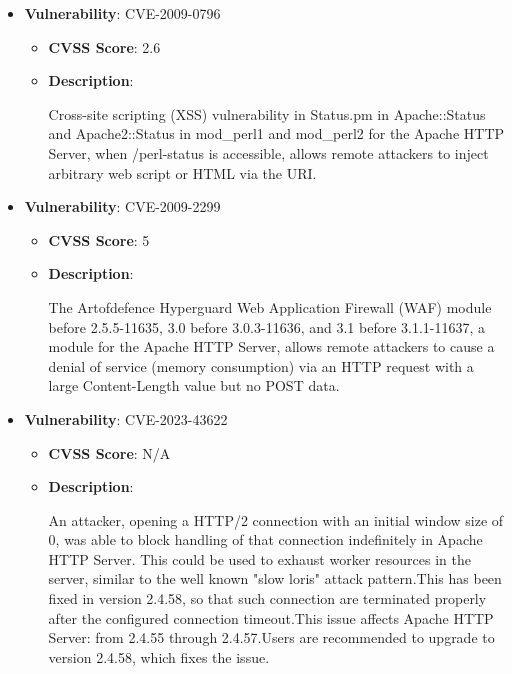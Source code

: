 \documentclass{article}
\begin{document}
\begin{itemize}
        \item \textbf{Vulnerability}: CVE-2009-0796
        \begin{itemize}
            \item \textbf{CVSS Score}:  2.6 
            \item \textbf{Description}:
            \parbox[t]{0.9\linewidth}{
                \ttfamily Cross-site scripting (XSS) vulnerability in Status.pm in Apache::Status and Apache2::Status in mod\_perl1 and mod\_perl2 for the Apache HTTP Server, when /perl-status is accessible, allows remote attackers to inject arbitrary web script or HTML via the URI.
            }
        \end{itemize}
    
        \item \textbf{Vulnerability}: CVE-2009-2299
        \begin{itemize}
            \item \textbf{CVSS Score}:  5 
            \item \textbf{Description}:
            \parbox[t]{0.9\linewidth}{
                \ttfamily The Artofdefence Hyperguard Web Application Firewall (WAF) module before 2.5.5-11635, 3.0 before 3.0.3-11636, and 3.1 before 3.1.1-11637, a module for the Apache HTTP Server, allows remote attackers to cause a denial of service (memory consumption) via an HTTP request with a large Content-Length value but no POST data.
            }
        \end{itemize}
    
        \item \textbf{Vulnerability}: CVE-2023-43622
        \begin{itemize}
            \item \textbf{CVSS Score}:  N/A 
            \item \textbf{Description}:
            \parbox[t]{0.9\linewidth}{
                \ttfamily An attacker, opening a HTTP/2 connection with an initial window size of 0, was able to block handling of that connection indefinitely in Apache HTTP Server. This could be used to exhaust worker resources in the server, similar to the well known "slow loris" attack pattern.This has been fixed in version 2.4.58, so that such connection are terminated properly after the configured connection timeout.This issue affects Apache HTTP Server: from 2.4.55 through 2.4.57.Users are recommended to upgrade to version 2.4.58, which fixes the issue.
            }
        \end{itemize}
    

\end{itemize}
\end{document}
